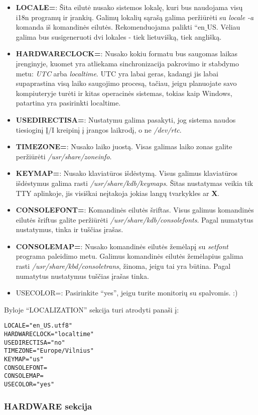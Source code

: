\begin{itemize}
  \item \textbf{LOCALE=}: Šita eilutė nusako sistemos lokalę, kuri bus
    naudojama visų i18n programų ir įrankių. Galimų lokalių sąrašą
    galima peržiūrėti su \textsl{locale -a} komanda iš komandinės
    eilutės. Rekomenduojama palikti ``en$\_$US. Vėliau galima bus
    susigeneruoti dvi lokales - tiek lietuvišką, tiek anglišką.
  \item \textbf{HARDWARECLOCK=}: Nusako kokiu formatu bus saugomas
    laikas įrenginyje, kuomet yra atliekama sinchronizacija pakrovimo
    ir stabdymo metu: \textsl{UTC} arba \textsl{localtime}. UTC yra
    labai geras, kadangi jis labai supaprastina visą laiko saugojimo
    procesą, tačiau, jeigu planuojate savo kompiuteryje turėti ir
    kitas operacinės sistemas, tokias kaip Windows, patartina yra
    pasirinkti localtime.
  \item \textbf{USEDIRECTISA=}: Nustatymu galima pasakyti, jog sistema
    naudos tiesioginį Į/I kreipinį į įrangos laikrodį, o ne
    \textsl{/dev/rtc}.
  \item \textbf{TIMEZONE=}: Nusako laiko juostą. Visas galimas laiko
    zonas galite peržiūrėti \textsl{/usr/share/zoneinfo}.
  \item \textbf{KEYMAP=}: Nusako klaviatūros išdėstymą. Visus galimus
    klaviatūros išdėstymus galima rasti
    \textsl{/usr/share/kdb/keymaps}. Šitas nustatymas veikia tik TTY
    aplinkoje, jis visiškai neįtakoja jokias langų tvarkykles ar
    \textbf{X}.
  \item \textbf{CONSOLEFONT=}: Komandinės eilutės šriftas. Visus
    galimus komandinės eilutės šriftus galite peržiūrėti
    \textsl{/usr/share/kdb/consolefonts}. Pagal numatytus nustatymus,
    tinka ir tuščias įrašas.
  \item \textbf{CONSOLEMAP=}: Nusako komandinės eilutės žemėlapį su
    \textsl{setfont} programa paleidimo metu. Galimus komandinės
    eilutės žemėlapius galima rasti
    \textsl{/usr/share/kbd/consoletrans}, žinoma, jeigu tai yra
    būtina. Pagal numatytus nustatymus tuščias įrašas tinka.
  \item {USECOLOR=}: Pasirinkite ``yes'', jeigu turite monitorių su
    spalvomis. :)
\end{itemize}
Byloje ``LOCALIZATION'' sekcija turi atrodyti panaši į:
\begin{verbatim}
LOCALE="en_US.utf8"
HARDWARECLOCK="localtime"
USEDIRECTISA="no"
TIMEZONE="Europe/Vilnius"
KEYMAP="us"
CONSOLEFONT=
CONSOLEMAP=
USECOLOR="yes"
\end{verbatim}

\subsubsection{HARDWARE sekcija}
